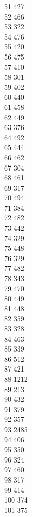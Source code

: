 { 51	427 \\
 52	466 \\
 53	322 \\
 54	476 \\
 55	420 \\
 56	475 \\
 57	410 \\
 58	301 \\
 59	402 \\
 60	440 \\
 61	458 \\
 62	449 \\
 63	376 \\
 64	492 \\
 65	444 \\
 66	462 \\
 67	304 \\
 68	461 \\
 69	317 \\
 70	494 \\
 71	384 \\
 72	482 \\
 73	442 \\
 74	329 \\
 75	448 \\
 76	329 \\
 77	482 \\
 78	343 \\
 79	470 \\
 80	449 \\
 81	448 \\
 82	359 \\
 83	328 \\
 84	463 \\
 85	339 \\
 86	512 \\
 87	421 \\
 88	1212 \\
 89	213 \\
 90	432 \\
 91	379 \\
 92	357 \\
 93	2485 \\
 94	406 \\
 95	350 \\
 96	324 \\
 97	460 \\
 98	317 \\
 99	414 \\
 100	374 \\
 101	375 \\
}
